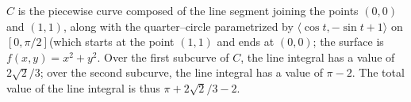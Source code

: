 {$C$ is the piecewise curve composed of the line segment joining the points $(0,0)$ and $(1,1)$, along with the quarter--circle parametrized by $\langle \cos t,-\sin t+1\rangle$ on $[0,\pi/2]$(which starts at the point $(1,1)$ and ends at $(0,0)$; the surface is $f(x,y)=x^2+y^2$.
}
{Over the first subcurve of $C$, the line integral has a value of $2\sqrt{2}/3$; over the second subcurve, the line integral has a value of $\pi-2$. The total value of the line integral is thus $\pi+2\sqrt{2}/3-2$.
}
